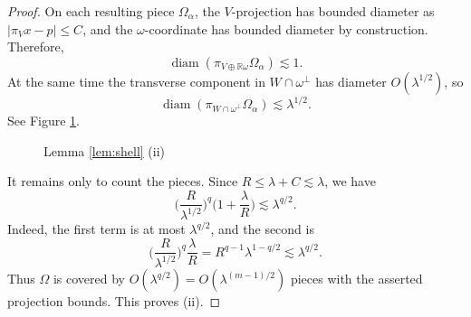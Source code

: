 \documentclass[10pt,a4paper]{amsart}
\newcommand{\R}{\mathbb R}
\newcommand{\ls}{\lesssim}
\begin{document}
\begin{proof}
		On each resulting piece $\Omega_\alpha$, the $V$-projection has bounded
		diameter as $|\pi_Vx-p|\le C$, and the $\omega$-coordinate has bounded
		diameter by construction. Therefore,
		\[
		\operatorname{diam}(\pi_{V\oplus\R\omega}\Omega_\alpha)\ls1.
		\]
		At the same time the transverse component in $W\cap\omega^\perp$ has
		diameter $O(\lambda^{1/2})$, so
		\[
		\operatorname{diam}(\pi_{W\cap\omega^\perp}\Omega_\alpha)
		\ls\lambda^{1/2}.
		\]
		See Figure \ref{fig1}.
		\begin{figure}[htbp]
			\centering
			
			\caption{Lemma \ref{lem:shell} (ii)}
			\label{fig1}
		\end{figure}
		
		It remains only to count the pieces.  Since $R\le\lambda+C\ls\lambda$,
		we have
		\[
		\Big(\frac{R}{\lambda^{1/2}}\Big)^q
		\Big(1+\frac{\lambda}{R}\Big)
		\ls
		\lambda^{q/2}.
		\]
		Indeed, the first term is at most $\lambda^{q/2}$, and the second is
		\[
		\Big(\frac{R}{\lambda^{1/2}}\Big)^q\frac{\lambda}{R}
		=R^{q-1}\lambda^{1-q/2}
		\ls\lambda^{q/2}.
		\]
		Thus $\Omega$ is covered by $O(\lambda^{q/2})=O(\lambda^{(m-1)/2})$
		pieces with the asserted projection bounds.  This proves (ii).
	\end{proof}
\end{document}
